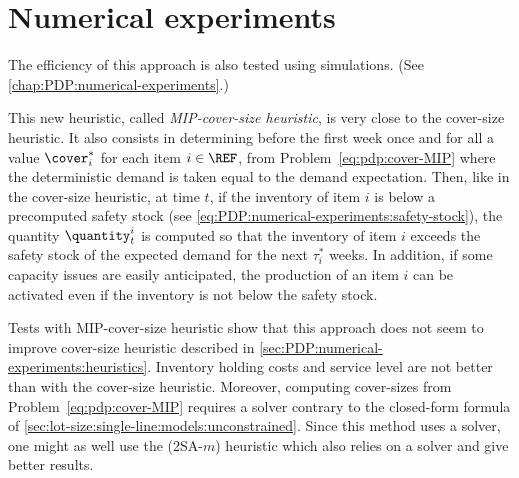 \section{Numerical experiments}
\label{sec:pdp-cover:numerical-experiments}


The efficiency of this approach is also tested using simulations. (See \cref{chap:PDP:numerical-experiments}.)


This new heuristic, called \emph{MIP-cover-size heuristic}, is very close to the cover-size heuristic.
It also consists in determining before the first week once and for all a value $\cover_i^*$ for each item $i\in\REF$, from Problem~\eqref{eq:pdp:cover-MIP} where the deterministic demand is taken equal to the demand expectation.
Then, like in the cover-size heuristic, at time $t$, if the inventory of item $i$ is below a precomputed safety stock (see \cref{eq:PDP:numerical-experiments:safety-stock}), the quantity $\quantity_t^i$ is computed so that the inventory of item $i$ exceeds the safety stock of the expected demand for the next $\tau_i^*$ weeks.
In addition, if some capacity issues are easily anticipated, the production of an item $i$ can be activated even if the inventory is not below the safety stock.


Tests with MIP-cover-size heuristic show that this approach does not seem to improve cover-size heuristic described in \cref{sec:PDP:numerical-experiments:heuristics}.
Inventory holding costs and service level are not better than with the cover-size heuristic.
Moreover, computing cover-sizes from Problem~\eqref{eq:pdp:cover-MIP} requires a solver contrary to the closed-form formula of \cref{sec:lot-size:single-line:models:unconstrained}.
Since this method uses a solver, one might as well use the (2SA-$m$) heuristic which also relies on a solver and give better results.

